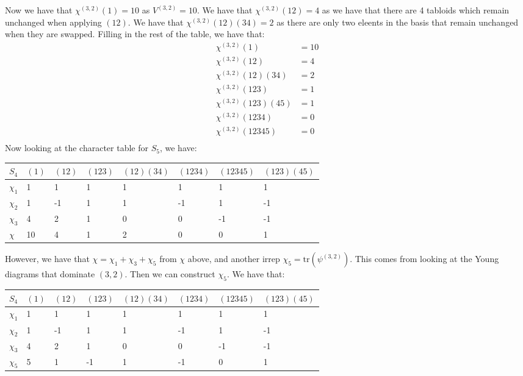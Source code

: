 \documentclass[]{article}
\newcommand{\tr}{\text{tr}}
\begin{document}
Now we have that $\chi^{(3,2)}(1) = 10$ as $V^{(3,2)} = 10$. We have that $\chi^{(3,2)}(12) = 4$ as we have that there are 4 tabloids which remain unchanged when applying $(12)$. We have that $\chi^{(3,2)}(12)(34) = 2$ as there are only two eleents in the basis that remain unchanged when they are swapped. Filling in the rest of the table, we have that:
\begin{align*}
	\chi^{(3,2)}(1) &= 10\\
	\chi^{(3,2)}(12) &= 4\\
	\chi^{(3,2)}(12)(34) &= 2\\
	\chi^{(3,2)}(123) &= 1\\
	\chi^{(3,2)}(123)(45) &= 1\\
	\chi^{(3,2)}(1234) &= 0\\
	\chi^{(3,2)}(12345) &= 0\\
\end{align*}
Now looking at the character table for $S_5$, we have:
\begin{table}[H]
\centering
\begin{tabular}{|l|l|l|l|l|l|l|l|}
	\hline
	$S_4$    & $(1)$ & $(12)$ & $(123)$ & $(12)(34)$ & $(1234)$ & $(12345)$ & $(123)(45)$ \\ \hline
	$\chi_1$ & 1     & 1      & 1       & 1          & 1        & 1         & 1           \\ \hline
	$\chi_2$ & 1     & -1     & 1       & 1          & -1       & 1         & -1          \\ \hline
	$\chi_3$ & 4     & 2      & 1       & 0          & 0        & -1        & -1          \\ \hline
	$\chi$   & 10    & 4     & 1        & 2          & 0        & 0         &  1          \\ \hline
\end{tabular}
\end{table}
However, we have that $\chi = \chi_1 + \chi_3 + \chi_5$ from $\chi$ above, and another irrep $\chi_5 = \tr(\psi^{(3,2)})$. This comes from looking at the Young diagrams that dominate $(3,2)$. Then we can construct $\chi_5$. 
We have that:
\begin{table}[H]
	\centering
	\begin{tabular}{|l|l|l|l|l|l|l|l|}
		\hline
		$S_4$    & $(1)$ & $(12)$ & $(123)$ & $(12)(34)$ & $(1234)$ & $(12345)$ & $(123)(45)$ \\ \hline
		$\chi_1$ & 1     & 1      & 1       & 1          & 1        & 1         & 1           \\ \hline
		$\chi_2$ & 1     & -1     & 1       & 1          & -1       & 1         & -1          \\ \hline
		$\chi_3$ & 4     & 2      & 1       & 0          & 0        & -1        & -1          \\ \hline
		$\chi_5$ & 5     & 1      & -1      & 1          & -1        & 0        & 1          \\ \hline
	\end{tabular}
\end{table}
\end{document}
